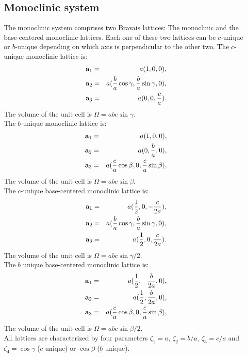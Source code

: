 \documentclass[12pt,a4paper,twoside]{report}
\begin{document}
{\color{web-blue}\subsection{Monoclinic system}}
\color{black}

The monoclinic system comprises two Bravais lattices:
The monoclinic and the base-centered monoclinic lattices.
Each one of these two lattices can be $c$-unique or $b$-unique depending on
which axis is perpendicular to the other two. 
The $c$-unique monoclinic lattice is:
\begin{eqnarray}
{\bf a}_1 &=& a (1, 0, 0), \nonumber \\
{\bf a}_2 &=& a ({b \over a} \cos{\gamma}, {b \over a}\sin{\gamma}, 0), \nonumber \\
{\bf a}_3 &=& a (0, 0, {c \over a}). 
\nonumber
\end{eqnarray}
The volume of the unit cell is $\Omega = abc \sin\gamma$. \\
The $b$-unique monoclinic lattice is:
\begin{eqnarray}
{\bf a}_1 &=& a (1, 0, 0), \nonumber \\
{\bf a}_2 &=& a (0, {b \over a}, 0), \nonumber \\
{\bf a}_3 &=& a ({c \over a} \cos{\beta}, 0, {c \over a}\sin{\beta}), \nonumber 
\end{eqnarray}
The volume of the unit cell is $\Omega = abc \sin\beta$. \\
The $c$-unique base-centered monoclinic lattice is:
\begin{eqnarray}
{\bf a}_1 &=& a ({1\over 2}, 0, -{c \over 2 a}), \nonumber \\
{\bf a}_2 &=& a ({b \over a} \cos{\gamma}, {b \over a}\sin{\gamma}, 0), \nonumber \\
{\bf a}_3 &=& a ({1\over 2}, 0, {c \over 2 a}). 
\nonumber
\end{eqnarray}
The volume of the unit cell is $\Omega = abc \sin\gamma/2$. \\
The $b$ unique base-centered monoclinic lattice is:
\begin{eqnarray}
{\bf a}_1 &=& a ({1\over 2}, -{b \over 2 a}, 0), \nonumber \\
{\bf a}_2 &=& a ({1\over 2}, {b \over 2 a}, 0), \nonumber \\
{\bf a}_3 &=& a ({c \over a} \cos{\beta}, 0, {c \over a}\sin{\beta}), \nonumber 
\end{eqnarray}
The volume of the unit cell is $\Omega = abc \sin\beta/2$. \\
All lattices are characterized by four parameters $\zeta_1=a$, $\zeta_2=b/a$,
$\zeta_3=c/a$ and $\zeta_4=\cos\gamma$
($c$-unique) or $\cos\beta$ ($b$-unique).
\end{document}
